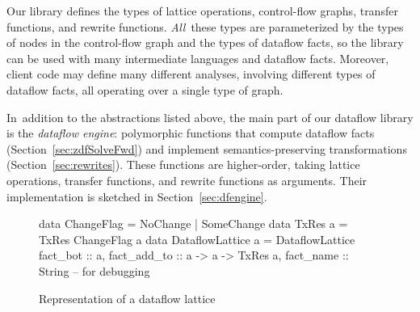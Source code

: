 \documentclass[blockstyle,preprint,natbib,nocopyrightspace]{sigplanconf}
\newcommand{\authornote}[1]{{\em #1}}
\def\authornote#1{\unskip\relax}
\newcommand{\simon}[1]{\authornote{SLPJ: #1}}
\newcommand\secref[1]{Section~\ref{sec:#1}}
\newcommand\figlabel[1]{\label{fig:#1}}
\begin{document}
\simon{Much improved!}
Our library defines the types of lattice operations,
control-flow graphs, transfer functions, and rewrite functions.
\emph{All}~these types are parameterized by the types of
nodes in the control-flow graph and the types of dataflow facts, so
the library can be used with many intermediate languages and
dataflow facts. 
\simon{Remove ``and dataflow facts''; it is covered
by the next sentence. It's confusing to cover the facts twice. 
Mabye worth splitting into two points, thus:
``All these types are parameterized by the types of
nodes in the control-flow graph, so the library can be used with 
many intermediate languages.  Moreover they are also o
parameterized by the type of dataflow facts, so that 
client code may define many different analyses, each involving
different types of dataflow facts.}
Moreover, client code may define many different analyses, involving
different types of dataflow facts, all operating over a single type of
graph. 

In~addition to the abstractions listed above, the main part of our
dataflow library is the \emph{dataflow engine}: 
polymorphic functions that compute 
dataflow facts (\secref{zdfSolveFwd}) and implement
semantics-preserving transformations (\secref{rewrites}).
\simon{A bit confusing.  How about ``In addition to the types sketched
above, the main API of our library is a small set of polymorphic functions
that compute 
dataflow facts (\secref{zdfSolveFwd}) and implement
semantics-preserving transformations (\secref{rewrites}).''}
These functions are higher-order, taking lattice operations, transfer
functions, and rewrite functions as arguments.
Their implementation is sketched in \secref{dfengine}.
\simon{Interface?  Perhpas ``The signatures and expected usage of these
functions is described in xxx, while their implementation is sketched
in yyy''}


\begin{figure}
\begin{code}
data ChangeFlag = NoChange | SomeChange
data TxRes a    = TxRes ChangeFlag a
data DataflowLattice a = DataflowLattice
 {fact_bot        :: a,
  fact_add_to     :: a -> a -> TxRes a,
  fact_name       :: String } -- for debugging
\end{code}
\caption{Representation of a dataflow lattice} \figlabel{lattice-type} \figlabel{lattice}
\end{figure}
\end{document}
